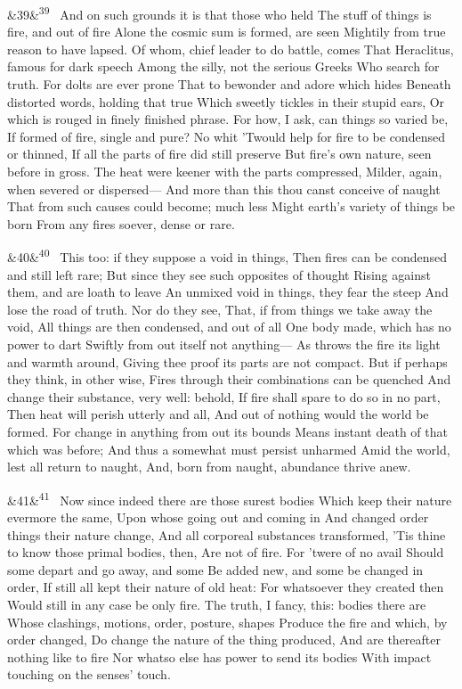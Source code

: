 \documentclass[12pt]{article}
\newcommand{\para}[1][]{\par\noindent\ifx&#1&\else\textsuperscript{\footnotesize #1}~\fi}
\begin{document}
\para[39] And on such grounds it is that those who held The stuff of things is fire, and out of fire Alone the cosmic sum is formed, are seen Mightily from true reason to have lapsed. Of whom, chief leader to do battle, comes That Heraclitus, famous for dark speech Among the silly, not the serious Greeks Who search for truth. For dolts are ever prone That to bewonder and adore which hides Beneath distorted words, holding that true Which sweetly tickles in their stupid ears, Or which is rouged in finely finished phrase. For how, I ask, can things so varied be, If formed of fire, single and pure? No whit 'Twould help for fire to be condensed or thinned, If all the parts of fire did still preserve But fire's own nature, seen before in gross. The heat were keener with the parts compressed, Milder, again, when severed or dispersed--- And more than this thou canst conceive of naught That from such causes could become; much less Might earth's variety of things be born From any fires soever, dense or rare.

\para[40] This too: if they suppose a void in things, Then fires can be condensed and still left rare; But since they see such opposites of thought Rising against them, and are loath to leave An unmixed void in things, they fear the steep And lose the road of truth. Nor do they see, That, if from things we take away the void, All things are then condensed, and out of all One body made, which has no power to dart Swiftly from out itself not anything--- As throws the fire its light and warmth around, Giving thee proof its parts are not compact. But if perhaps they think, in other wise, Fires through their combinations can be quenched And change their substance, very well: behold, If fire shall spare to do so in no part, Then heat will perish utterly and all, And out of nothing would the world be formed. For change in anything from out its bounds Means instant death of that which was before; And thus a somewhat must persist unharmed Amid the world, lest all return to naught, And, born from naught, abundance thrive anew.

\para[41] Now since indeed there are those surest bodies Which keep their nature evermore the same, Upon whose going out and coming in And changed order things their nature change, And all corporeal substances transformed, 'Tis thine to know those primal bodies, then, Are not of fire. For 'twere of no avail Should some depart and go away, and some Be added new, and some be changed in order, If still all kept their nature of old heat: For whatsoever they created then Would still in any case be only fire. The truth, I fancy, this: bodies there are Whose clashings, motions, order, posture, shapes Produce the fire and which, by order changed, Do change the nature of the thing produced, And are thereafter nothing like to fire Nor whatso else has power to send its bodies With impact touching on the senses' touch.
\end{document}
